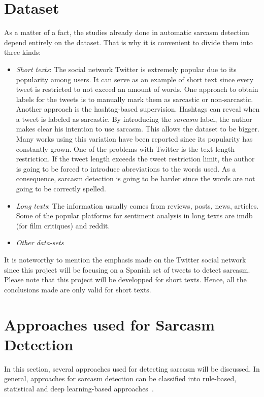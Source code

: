 \section{Dataset~\cite{joshi2017automatic}}

As a matter of a fact, the studies already done in automatic sarcasm detection depend entirely on the dataset. That is why it is convenient to divide them into three kinds:
\begin{itemize}
	\item \textit{Short texts}: The social network Twitter is extremely popular due to its popularity among users. It can serve as an example of short text since every tweet is restricted to not exceed an amount of words. One approach to obtain labels for the tweets is to manually mark them as sarcastic or non-sarcastic. Another approach is the hashtag-based supervision. Hashtags can reveal when a tweet is labeled as sarcastic. By introducing the \textit{sarcasm} label, the author makes clear his intention to use sarcasm.  This allows the dataset to be bigger. Many works using this variation have been reported since its popularity has constantly grown. One of the problems with Twitter is the text length restriction. If the tweet length exceeds the tweet restriction limit, the author is going to be forced to introduce abreviations to the words used. As a consequence, sarcasm detection is going to be harder since the words are not going to be correctly spelled.
	\item \textit{Long texts}: The information usually comes from reviews, posts, news, articles. Some of the popular platforms for sentiment analysis in long texts are imdb (for film critiques) and reddit. 
	\item \textit{Other data-sets}
\end{itemize}

It is noteworthy to mention the emphasis made on the Twitter social network since this project will be focusing on a Spanish set of tweets to detect sarcasm. Please note that this project will be developped for short texts. Hence, all the conclusions made are only valid for short texts.

\section{Approaches used for Sarcasm Detection}
\label{sec:sarcasmapproach}
In this section, several approaches used for detecting sarcasm will be discussed. In general, approaches for sarcasm detection can be classified into rule-based, statistical and deep learning-based approaches~\cite{joshi2017automatic}.
